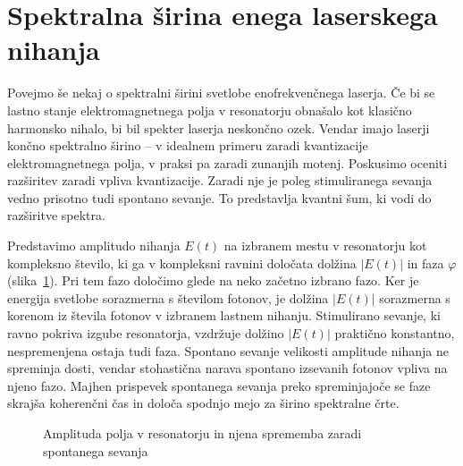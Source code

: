 \section{Spektralna širina enega laserskega nihanja}
Povejmo še nekaj o spektralni širini svetlobe enofrekvenčnega laserja. 
Če bi se lastno stanje 
elektromagnetnega polja v resonatorju obnašalo kot klasično 
harmonsko nihalo, bi bil spekter laserja neskončno ozek. Vendar 
imajo laserji končno spektralno širino -- v idealnem primeru zaradi
kvantizacije elektromagnetnega polja, v praksi pa zaradi zunanjih motenj.
Poskusimo oceniti razširitev zaradi vpliva kvantizacije. Zaradi nje
je poleg stimuliranega sevanja vedno prisotno tudi spontano sevanje. To 
predstavlja kvantni šum, ki vodi do razširitve spektra. 

Predstavimo amplitudo nihanja $E(t)$ na izbranem mestu v resonatorju kot kompleksno 
število, ki ga v kompleksni ravnini določata dolžina $|E(t)|$ in faza
$\varphi$ (slika~\ref{fig:fazor}). 
Pri tem fazo določimo glede na neko začetno izbrano fazo. 
Ker je energija svetlobe sorazmerna s številom fotonov, je dolžina $|E(t)|$
sorazmerna s korenom iz števila fotonov v izbranem lastnem nihanju. 
Stimulirano sevanje, ki ravno pokriva izgube resonatorja, vzdržuje
dolžino $|E(t)|$ praktično konstantno, nespremenjena ostaja 
tudi faza. Spontano sevanje velikosti amplitude nihanja ne spreminja dosti, 
vendar stohastična narava spontano izsevanih fotonov vpliva na njeno fazo.
Majhen prispevek spontanega sevanja preko spreminjajoče se faze
skrajša koherenčni čas in določa spodnjo mejo za širino spektralne črte. 

\begin{figure}[h]
\centering
\def\svgwidth{70truemm} 

\caption{Amplituda polja v resonatorju in njena sprememba zaradi 
spontanega sevanja}
\label{fig:fazor}
\end{figure}

